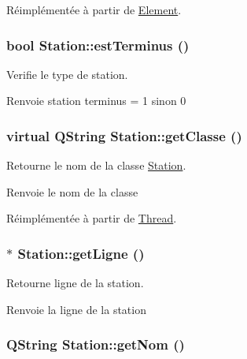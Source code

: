 Réimplémentée à partir de \hyperlink{classElement_a4f4cc97e3122305ec6f4a8953aba23d5}{Element}.

\hypertarget{classStation_ad2c82ba6d816f24c26970c4468351807}{
\subsubsection[{estTerminus}]{\setlength{\rightskip}{0pt plus 5cm}bool Station::estTerminus ()}}
\label{classStation_ad2c82ba6d816f24c26970c4468351807}


Verifie le type de station. 

\begin{DoxyReturn}{Renvoie}
station terminus = 1 sinon 0 
\end{DoxyReturn}
\hypertarget{classStation_aea030824145267b81a453f5b56227cae}{
\subsubsection[{getClasse}]{\setlength{\rightskip}{0pt plus 5cm}virtual QString Station::getClasse ()}}
\label{classStation_aea030824145267b81a453f5b56227cae}


Retourne le nom de la classe \hyperlink{classStation}{Station}. 

\begin{DoxyReturn}{Renvoie}
le nom de la classe 
\end{DoxyReturn}


Réimplémentée à partir de \hyperlink{classThread_ad055e7c603fda2607670f69c32b2d98a}{Thread}.

\hypertarget{classStation_a3ee72b5920d69350770fa056d6b675bc}{
\subsubsection[{getLigne}]{ $\ast$ Station::getLigne ()}}
\label{classStation_a3ee72b5920d69350770fa056d6b675bc}


Retourne ligne de la station. 

\begin{DoxyReturn}{Renvoie}
la ligne de la station 
\end{DoxyReturn}
\hypertarget{classStation_ac73e2b60d199734b494e84fa065a6643}{
\subsubsection[{getNom}]{\setlength{\rightskip}{0pt plus 5cm}QString Station::getNom ()}}
\label{classStation_ac73e2b60d199734b494e84fa065a6643}


